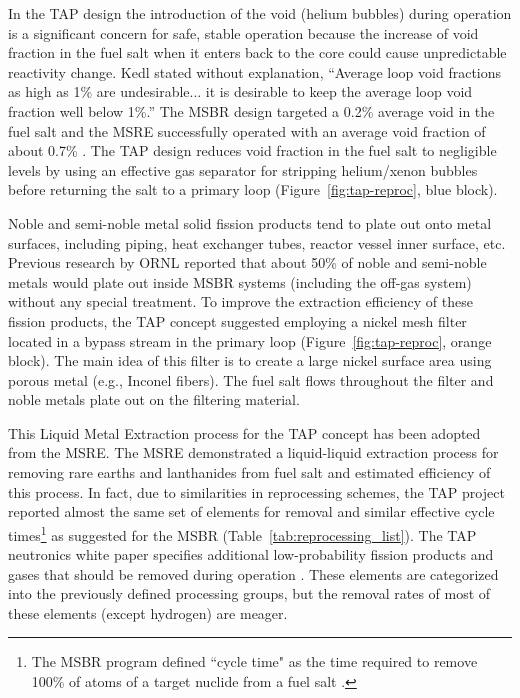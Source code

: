 In the \gls{TAP} design the introduction of the void (helium bubbles) during 
operation is a significant concern for safe, stable operation because the 
increase of void fraction in the fuel salt when it enters back to the core 
could cause unpredictable reactivity change. Kedl stated without explanation, 
``Average loop void fractions as high as 1\% are undesirable... it is 
desirable to keep the average loop void fraction well below 
1\%.''\cite{robertson_conceptual_1971} The \gls{MSBR} design targeted a 0.2\% 
average void in the fuel salt \cite{robertson_conceptual_1971} and the 
\gls{MSRE} successfully operated with an average void fraction of about 0.7\% 
\cite{compere_fission_1975}. The \gls{TAP} design reduces void fraction in the 
fuel salt to negligible levels by using an effective gas separator for 
stripping helium/xenon bubbles before returning the salt to a primary loop 
(Figure~\ref{fig:tap-reproc}, blue block). 

Noble and semi-noble metal solid fission products tend to plate out onto metal 
surfaces, including piping, heat exchanger tubes, reactor vessel inner 
surface, etc. Previous research by \gls{ORNL} \cite{robertson_conceptual_1971} 
reported that about 50\% of noble and semi-noble metals would plate out inside 
\gls{MSBR} systems (including the off-gas system) without any special 
treatment. To improve the extraction efficiency of these fission products, the 
\gls{TAP} concept suggested employing a nickel mesh filter located in a bypass 
stream in the primary loop (Figure~\ref{fig:tap-reproc}, orange block). The 
main idea of this filter is to create a large nickel surface area using porous 
metal (e.g., Inconel fibers). The fuel salt flows throughout the filter 
and noble metals plate out on the filtering material. 

This Liquid Metal Extraction process for the \gls{TAP} concept has been 
adopted from the \gls{MSRE}. The \gls{MSRE} demonstrated a liquid-liquid 
extraction process for removing rare earths and lanthanides from fuel salt and 
estimated efficiency of this process. In fact, due to similarities in 
reprocessing schemes, the \gls{TAP} project reported almost the same set of 
elements for removal and similar effective cycle times\footnote{The \gls{MSBR} 
program defined ``cycle time" as the time required to remove 100\% of atoms of 
a target nuclide from a
fuel salt \cite{robertson_conceptual_1971}.
} as 
suggested for the \gls{MSBR} (Table~\ref{tab:reprocessing_list}). The 
\gls{TAP} neutronics white paper specifies additional low-probability fission 
products and gases that should be removed during operation  
\cite{transatomic_power_corporation_neutronics_2016}. These elements are 
categorized into the previously defined processing groups, but the removal 
rates of most of these elements (except hydrogen) are meager.

